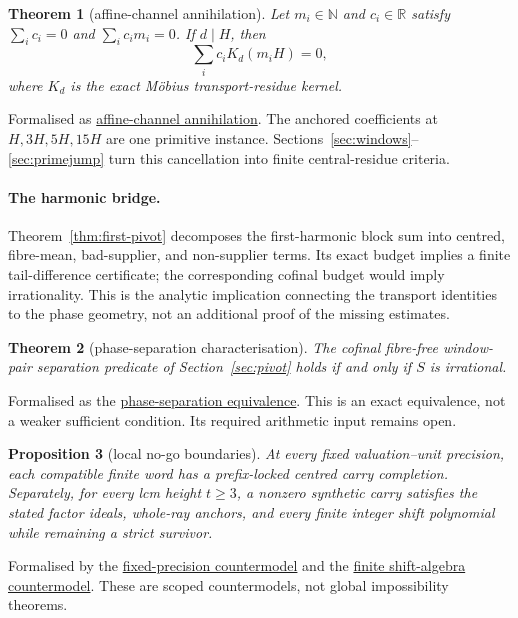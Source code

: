 \documentclass[11pt]{article}
\newcommand{\commit}{c24e2c2a781aa4a104d10884bacae52ef35cff30}
\newcommand{\repobase}{https://github.com/wcook04/plectis-lean-erdos249-257/blob/\commit}
\newcommand{\PK}{Erdos249257}
\newcommand{\lword}[4]{\href{\repobase/\PK/#1\#L#2}{#4}}
\newtheorem{theorem}{Theorem}[section]
\newtheorem{proposition}[theorem]{Proposition}
\theoremstyle{remark}\newtheorem*{remark}{Remark}
\begin{document}
\begin{theorem}[affine-channel annihilation]\label{thm:affine}
Let \(m_i\in\mathbb N\) and \(c_i\in\mathbb R\) satisfy
\(\sum_i c_i=0\) and \(\sum_i c_im_i=0\).  If \(d\mid H\), then
\[
  \sum_i c_i K_d(m_iH)=0,
\]
where \(K_d\) is the exact M\"obius transport-residue kernel.
\end{theorem}
\noindent Formalised as
\lword{JointExponentTransport.lean}{36}{oldChannel_affine_moment_annihilation}{affine-channel annihilation}.
The anchored coefficients at \(H,3H,5H,15H\) are one primitive instance.
Sections~\ref{sec:windows}--\ref{sec:primejump} turn this cancellation into
finite central-residue criteria.

\paragraph{The harmonic bridge.}
Theorem~\ref{thm:first-pivot} decomposes the first-harmonic block sum into
centred, fibre-mean, bad-supplier, and non-supplier terms.  Its exact budget
implies a finite tail-difference certificate; the corresponding cofinal
budget would imply irrationality.  This is the analytic implication connecting
the transport identities to the phase geometry, not an additional proof of
the missing estimates.

\begin{theorem}[phase-separation characterisation]\label{thm:phase}
The cofinal fibre-free window-pair separation predicate of
Section~\ref{sec:pivot} holds if and only if \(S\) is irrational.
\end{theorem}
\noindent Formalised as the
\lword{PivotAntiReconstruction.lean}{1744}{dtwWindowSeparatedPairs_iff_irrational_totient_series}{phase-separation equivalence}.
This is an exact equivalence, not a weaker sufficient condition.  Its required
arithmetic input remains open.

\begin{proposition}[local no-go boundaries]\label{prop:nogo}
At every fixed valuation--unit precision, each compatible finite word has a
prefix-locked centred carry completion.  Separately, for every lcm height
\(t\ge3\), a nonzero synthetic carry satisfies the stated factor ideals,
whole-ray anchors, and every finite integer shift polynomial while remaining
a strict survivor.
\end{proposition}
\noindent Formalised by the
\lword{TropicalCurvatureCarry.lean}{137}{fixedPrecisionTropicalNoGo}{fixed-precision countermodel}
and the
\lword{LcmFactorIdealPulseObstruction.lean}{798}{lcm_factorIdeal_finiteRank_shiftAlgebra_not_sufficient}{finite shift-algebra countermodel}.
These are scoped countermodels, not global impossibility theorems.
\end{document}
